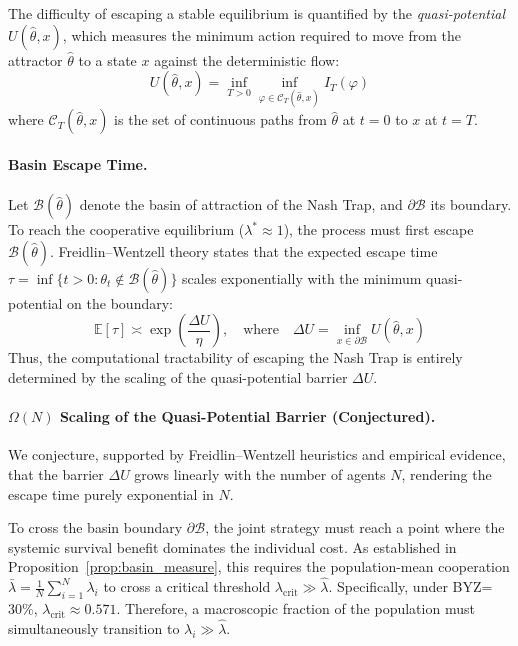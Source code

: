 The difficulty of escaping a stable equilibrium is quantified by the \emph{quasi-potential} $U(\hat{\theta}, x)$, which measures the minimum action required to move from the attractor $\hat{\theta}$ to a state $x$ against the deterministic flow:
\begin{equation}
U(\hat{\theta}, x) = \inf_{T>0} \inf_{\varphi \in \mathcal{C}_{T}(\hat{\theta}, x)} I_T(\varphi)
\end{equation}
where $\mathcal{C}_{T}(\hat{\theta}, x)$ is the set of continuous paths from $\hat{\theta}$ at $t=0$ to $x$ at $t=T$.

\paragraph{Basin Escape Time.}
Let $\mathcal{B}(\hat{\theta})$ denote the basin of attraction of the Nash Trap, and $\partial \mathcal{B}$ its boundary.
To reach the cooperative equilibrium ($\lambda^* \approx 1$), the process must first escape $\mathcal{B}(\hat{\theta})$.
Freidlin--Wentzell theory states that the expected escape time $\tau = \inf\{t > 0 : \theta_t \notin \mathcal{B}(\hat{\theta})\}$ scales exponentially with the minimum quasi-potential on the boundary:
\begin{equation}
\mathbb{E}[\tau] \asymp \exp\left( \frac{\Delta U}{\eta} \right), \quad \text{where} \quad \Delta U = \inf_{x \in \partial \mathcal{B}} U(\hat{\theta}, x)
\label{eq:fw_escape_time}
\end{equation}
Thus, the computational tractability of escaping the Nash Trap is entirely determined by the scaling of the quasi-potential barrier $\Delta U$.

\paragraph{$\Omega(N)$ Scaling of the Quasi-Potential Barrier (Conjectured).}
We conjecture, supported by Freidlin--Wentzell heuristics and empirical evidence, that the barrier $\Delta U$ grows linearly with the number of agents $N$, rendering the escape time purely exponential in $N$.

To cross the basin boundary $\partial \mathcal{B}$, the joint strategy must reach a point where the systemic survival benefit dominates the individual cost.
As established in Proposition~\ref{prop:basin_measure}, this requires the population-mean cooperation $\bar{\lambda} = \frac{1}{N} \sum_{i=1}^N \lambda_i$ to cross a critical threshold $\lambda_{\mathrm{crit}} \gg \hat{\lambda}$. Specifically, under BYZ=$30\%$, $\lambda_{\mathrm{crit}} \approx 0.571$.
Therefore, a macroscopic fraction of the population must simultaneously transition to $\lambda_i \gg \hat{\lambda}$.

